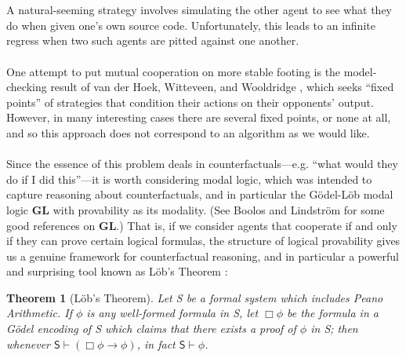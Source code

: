 \documentclass[12pt, letterpaper]{article}
\newtheorem{theorem}{Theorem}[section]
\numberwithin{equation}{section}
\begin{document}
\\
\\A natural-seeming strategy involves simulating the other agent to see what they do when given one's own source code. Unfortunately, this leads to an infinite regress when two such agents are pitted against one another.
\\
\\One attempt to put mutual cooperation on more stable footing is the model-checking result of van der Hoek, Witteveen, and Wooldridge \cite{HWW}, which seeks ``fixed points'' of strategies that condition their actions on their opponents' output. However, in many interesting cases there are several fixed points, or none at all, and so this approach does not correspond to an algorithm as we would like.
\\
\\ Since the essence of this problem deals in counterfactuals---e.g. ``what would they do if I did this''---it is worth considering modal logic, which was intended to capture reasoning about counterfactuals, and in particular the G\"{o}del-L\"{o}b modal logic \textbf{GL} with provability as its modality. (See Boolos \cite{Boolos} and Lindstr\"{o}m \cite{Lindstrom} for some good references on \textbf{GL}.) That is, if we consider agents that cooperate if and only if they can prove certain logical formulas, the structure of logical provability gives us a genuine framework for counterfactual reasoning, and in particular a powerful and surprising tool known as L\"{o}b's Theorem \cite{Lob}:
\begin{theorem} [L\"{o}b's Theorem] \label{lobtheorem}
Let \textsf{S} be a formal system which includes Peano Arithmetic. If $\phi$ is any well-formed formula in \textsf{S}, let $\Box \phi$ be the formula in a G\"{o}del encoding of \textsf{S} which claims that there exists a proof of $\phi$ in \textsf{S}; then whenever $\textsf{S}\vdash (\Box \phi \to\phi)$, in fact $\textsf{S}\vdash \phi$.
\end{theorem}
\end{document}
